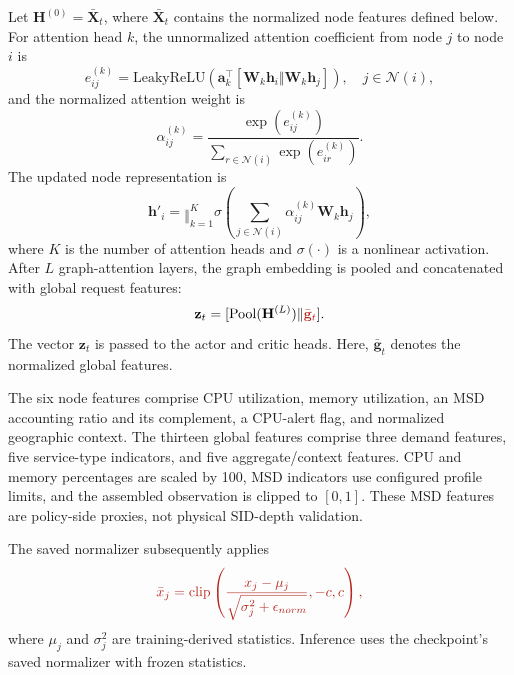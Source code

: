 \documentclass[final,5p]{elsarticle}
\newcommand{\rev}[1]{\textcolor{BrickRed}{#1}}
\begin{document}
Let \rev{\(\mathbf{H}^{(0)}=\bar{\mathbf{X}}_t\), where \(\bar{\mathbf X}_t\) contains the normalized node features defined below.} For attention head \(k\), the unnormalized attention coefficient from node \(j\) to node \(i\) is
\begin{equation}
    e_{ij}^{(k)}
    =
    \mathrm{LeakyReLU}
    \left(
    \mathbf{a}_{k}^{\top}
    [\mathbf{W}_{k}\mathbf{h}_i \Vert \mathbf{W}_{k}\mathbf{h}_j]
    \right),
    \quad j\in\mathcal{N}(i),
\end{equation}
and the normalized attention weight is
\begin{equation}
    \alpha_{ij}^{(k)}
    =
    \frac{\exp(e_{ij}^{(k)})}
    {\sum_{r\in\mathcal{N}(i)}\exp(e_{ir}^{(k)})}.
\end{equation}
The updated node representation is
\begin{equation}
    \mathbf{h}'_i
    =
    \mathop{\Vert}_{k=1}^{K}
    \sigma
    \left(
    \sum_{j\in\mathcal{N}(i)}
    \alpha_{ij}^{(k)}\mathbf{W}_{k}\mathbf{h}_j
    \right),
\end{equation}
where \(K\) is the number of attention heads and \(\sigma(\cdot)\) is a nonlinear activation. After \(L\) graph-attention layers, the graph embedding is pooled and concatenated with global request features:
\begin{equation}
\mathbf{z}_t=[\mathrm{Pool}(\mathbf{H}^{(L)})\Vert\rev{\bar{\mathbf{g}}_t}].
\end{equation}
The vector \(\mathbf{z}_t\) is passed to the actor and critic heads. \rev{Here, \(\bar{\mathbf g}_t\) denotes the normalized global features.}

\rev{The six node features comprise CPU utilization, memory utilization, an MSD accounting ratio and its complement, a CPU-alert flag, and normalized geographic context. The thirteen global features comprise three demand features, five service-type indicators, and five aggregate/context features. CPU and memory percentages are scaled by 100, MSD indicators use configured profile limits, and the assembled observation is clipped to \([0,1]\). These MSD features are policy-side proxies, not physical SID-depth validation.}

\rev{The saved normalizer subsequently applies}
\begin{equation}
\rev{\bar{x}_j=\mathrm{clip}\left(\frac{x_j-\mu_j}{\sqrt{\sigma_j^2+\epsilon_{norm}}},-c,c\right),}
\end{equation}
\rev{where \(\mu_j\) and \(\sigma_j^2\) are training-derived statistics. \rev{Inference uses the checkpoint's saved normalizer with frozen statistics.}}
\end{document}
